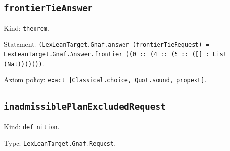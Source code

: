 \documentclass[11pt]{article}
\begin{document}
\subsection*{\texttt{frontierTieAnswer}}
\noindent Kind: \texttt{theorem}.\par
\noindent Statement: \texttt{(LexLeanTarget.Gnaf.answer (frontierTieRequest) = LexLeanTarget.Gnaf.Answer.frontier ((0 :: (4 :: (5 :: ([] : List (Nat)))))))}.\par
\noindent Axiom policy: \texttt{exact [Classical.choice, Quot.sound, propext]}.\par
\subsection*{\texttt{inadmissiblePlanExcludedRequest}}
\noindent Kind: \texttt{definition}.\par
\noindent Type: \texttt{LexLeanTarget.Gnaf.Request}.\par
\end{document}

